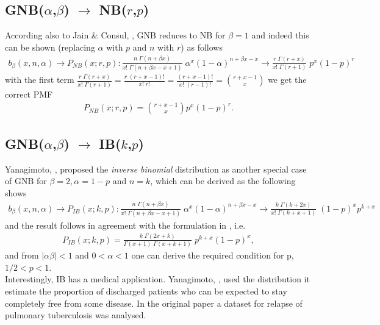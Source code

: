 \subsection*{GNB($\alpha$,$\beta$) $\rightarrow$ NB($r$,$p$)}
According also to Jain \& Consul, \cite{jain1971generalized}, GNB reduces to NB for $\beta = 1$ and 
indeed this can be shown (replacing $\alpha$ with $p$ and $n$ with $r$) as follows
\begin{align*}
 b_{\beta}(x,n,\alpha) \rightarrow P_{N\!B}(x;r,p):
 \frac{n \; \Gamma(n+\beta x)}{x! \;\Gamma(n + \beta x - x +1)}  \; \alpha^x (1-\alpha)^{n+\beta x-x} \rightarrow 
\frac{r \; \Gamma(r + x)}{x! \;\Gamma(r + 1)}  \; p^x (1-p)^{r} 
\end{align*}
with the first term $\frac{r \; \Gamma(r + x)}{x! \;\Gamma(r + 1)} = \frac{r \; (r + x - 1)!}{x! \;r!} = \frac{(r + x - 1)!}{x! \;(r-1)!}
= {r + x - 1 \choose x}$ we get the correct PMF
\begin{align*}
P_{N\!B}(x;r,p) = {r + x - 1 \choose x} p^x (1-p)^r  .
\end{align*}


\subsection*{GNB($\alpha$,$\beta$) $\rightarrow$ IB($k$,$p$)}
Yanagimoto, \cite{yanagimoto1989inverse}, proposed the \emph{inverse binomial} 
distribution as another special case of GNB for $\beta = 2, \alpha=1-p$ and $n=k$, which 
can be derived as the following shows 
\begin{align*}
b_{\beta}(x,n,\alpha) \rightarrow P_{I\!B}(x;k,p):
 \frac{n \; \Gamma(n+\beta x)}{x! \;\Gamma(n + \beta x - x +1)}  \; \alpha^x (1-\alpha)^{n+\beta x-x} \rightarrow 
\frac{k \; \Gamma(k + 2x)}{x! \;\Gamma(k + x + 1)}  \; (1-p)^x p^{k+x} 
\end{align*}
and the result follows in agreement with the formulation in \cite{yanagimoto1989inverse}, i.e.
\begin{align*}
P_{I\!B}(x;k,p) = \frac{k \; \Gamma(2x + k)}{\Gamma(x+1) \;\Gamma(x + k + 1)}  \; p^{k+x} (1-p)^x ,
\end{align*}
and from $|\alpha \beta| < 1$ and $0<\alpha<1$ one can derive the required condition for p, $1/2 < p < 1$.\\
Interestingly, IB has a medical application. Yanagimoto, \cite{yanagimoto1989inverse}, 
used the distribution it estimate the proportion of discharged patients who can be 
expected to stay completely free from some disease. In the original paper a dataset
for relapse of pulmonary tuberculosis was analysed.

